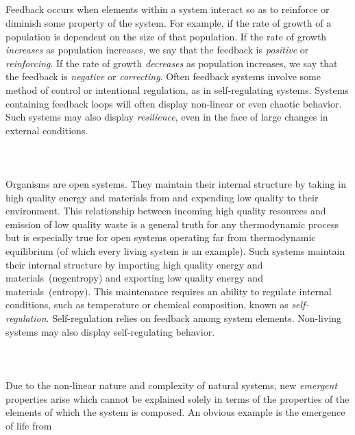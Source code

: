 \begin{svgraybox}
\\\\
\\\\
Feedback occurs when elements within a system interact so as
to reinforce or diminish some property of the system.
For example, if the rate of growth of a population
is dependent on the size of that population.
If the rate of growth \emph{increases} as population increases,
we say that the feedback is \emph{positive} or \emph{reinforcing}.
If the rate of growth \emph{decreases} as population increases,
we say that the feedback is \emph{negative} or \emph{correcting}.
Often feedback systems involve some method of control or 
intentional regulation,
as in self-regulating systems.
Systems containing feedback loops will often display
non-linear or even chaotic behavior. 
Such systems may also display \emph{resilience},
even in the face of large changes in external conditions.
\\\\
\\\\
Organisms are open systems.
They maintain their internal structure by taking in
high quality energy and materials from 
and expending low quality to their
environment. 
This relationship between 
incoming high quality resources and emission of low
quality waste is a general truth 
for any thermodynamic process but is especially
true for open systems operating far from 
thermodynamic equilibrium 
(of which every living system is an example). 
Such systems maintain their internal structure by
importing high quality energy and 
materials~(negentropy) and exporting low quality
energy and materials~(entropy).\cite{Schroedinger1947}
This maintenance requires an ability to regulate
internal conditions,
such as temperature or chemical composition, 
known as \emph{self-regulation}.
Self-regulation relies on feedback among system elements.
Non-living systems may also display self-regulating behavior.
\\\\
\\\\
Due to the non-linear nature and complexity of natural systems,
new \emph{emergent} properties arise which cannot
be explained solely in terms of the properties 
of the elements of which
the system is composed.
An obvious example is the emergence of life from

\end{svgraybox}
